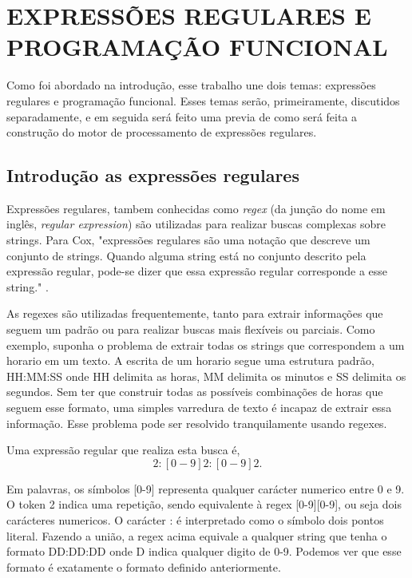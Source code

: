 \section{EXPRESSÕES REGULARES E PROGRAMAÇÃO FUNCIONAL}
Como foi abordado na introdução, esse trabalho une dois temas: expressões regulares e programação funcional.
Esses temas serão, primeiramente, discutidos separadamente, e em seguida será feito uma previa de como será feita a construção do motor de processamento de expressões regulares.

\subsection{Introdução as expressões regulares}

Expressões regulares, tambem conhecidas como \emph{regex} (da junção do nome em inglês, \emph{regular expression}) são utilizadas para realizar buscas complexas sobre strings.
Para Cox,
"expressões regulares são uma notação que descreve um conjunto de strings.
Quando alguma string está no conjunto descrito pela expressão regular, pode-se dizer que essa expressão regular corresponde a esse string." \cite{cox}.

As regexes são utilizadas frequentemente, tanto para extrair informações que seguem um padrão ou para realizar buscas mais flexíveis ou parciais.
Como exemplo, suponha o problema de extrair todas os strings que correspondem a um horario em um texto.
A escrita de um horario segue uma estrutura padrão, HH:MM:SS onde HH delimita as horas, MM delimita os minutos e SS delimita os segundos.
Sem ter que construir todas as possíveis combinações de horas que seguem esse formato, uma simples varredura de texto é incapaz de extrair essa informação.
Esse problema pode ser resolvido tranquilamente usando regexes.

Uma expressão regular que realiza esta busca é,
\begin{equation}
  [0-9]{2}:[0-9]{2}:[0-9]{2} .
\end{equation}

Em palavras, os símbolos [0-9] representa qualquer carácter numerico entre 0 e 9.
O token {2} indica uma repetição, sendo equivalente à regex [0-9][0-9], ou seja dois carácteres numericos.
O carácter : é interpretado como o símbolo dois pontos literal.
Fazendo a união, a regex acima equivale a qualquer string que tenha o formato DD:DD:DD onde D indica qualquer digito de 0-9.
Podemos ver que esse formato é exatamente o formato definido anteriormente.

